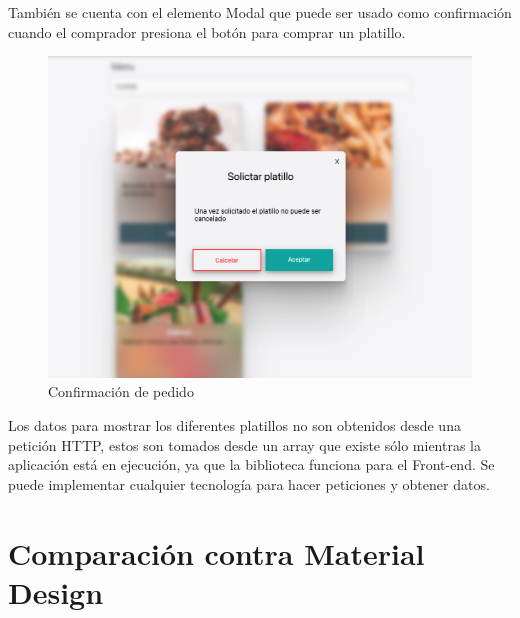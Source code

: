 También se cuenta con el elemento Modal que puede ser usado como confirmación cuando el comprador presiona el botón para comprar un platillo.
\newline
\begin{figure}[H]
    \includegraphics[width=1\textwidth]{./Imagenes/9.15.png}
   \centering 
    \caption[Confirmación de pedido]{Confirmación de pedido}
    \end{figure}
\newline

Los datos para mostrar los diferentes platillos no son obtenidos desde una petición HTTP, estos son tomados desde un array que existe sólo mientras la aplicación está en ejecución, ya que la biblioteca funciona para el Front-end.  Se puede implementar cualquier tecnología para hacer peticiones y obtener datos.

\section{Comparación contra Material Design}

